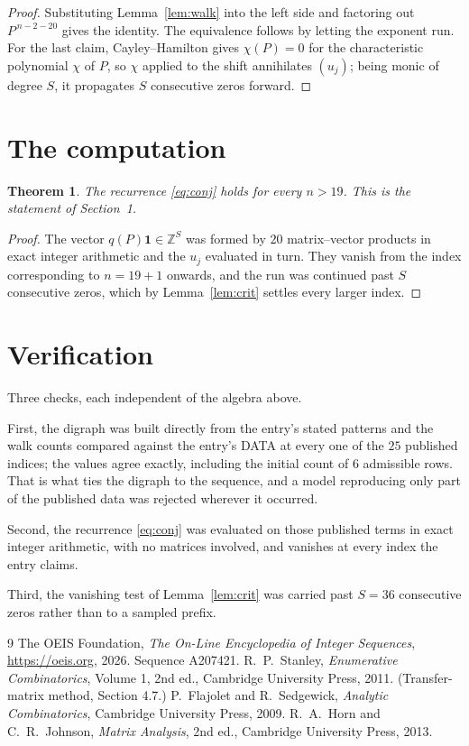 \documentclass[11pt,a4paper]{article}
\theoremstyle{plain}
\newtheorem{theorem}{Theorem}
\theoremstyle{definition}
\begin{document}
\begin{proof}
Substituting Lemma~\ref{lem:walk} into the left side and factoring out
$P^{\,n-2-20}$ gives the identity. The equivalence follows by letting the exponent
run. For the last claim, Cayley--Hamilton gives $\chi(P)=0$ for the characteristic
polynomial $\chi$ of $P$, so $\chi$ applied to the shift annihilates $(u_j)$; being monic of
degree $S$, it propagates $S$ consecutive zeros forward.
\end{proof}

\section{The computation}

\begin{theorem}
The recurrence \eqref{eq:conj} holds for every $n>19$. This is the statement of
Section~1.
\end{theorem}

\begin{proof}
The vector $q(P)\mathbf{1}\in\mathbb{Z}^{S}$ was formed by $20$ matrix--vector
products in exact integer arithmetic and the $u_j$ evaluated in turn. They vanish from the
index corresponding to $n=19+1$ onwards, and the run was continued past $S$ consecutive
zeros, which by Lemma~\ref{lem:crit} settles every larger index.
\end{proof}

\section{Verification}

Three checks, each independent of the algebra above.

First, the digraph was built directly from the entry's stated patterns and the walk counts
compared against the entry's DATA at every one of the $25$ published indices; the
values agree exactly, including the initial count of $6$ admissible rows. That is
what ties the digraph to the sequence, and a model reproducing only part of the published
data was rejected wherever it occurred.

Second, the recurrence \eqref{eq:conj} was evaluated on those published terms in exact
integer arithmetic, with no matrices involved, and vanishes at every index the entry claims.

Third, the vanishing test of Lemma~\ref{lem:crit} was carried past $S=36$ consecutive
zeros rather than to a sampled prefix.

\begin{thebibliography}{9}
 The OEIS Foundation, \emph{The On-Line Encyclopedia of Integer
Sequences}, \url{https://oeis.org}, 2026. Sequence A207421.
 R.~P.~Stanley, \emph{Enumerative Combinatorics}, Volume 1, 2nd ed.,
Cambridge University Press, 2011. (Transfer-matrix method, Section 4.7.)
 P.~Flajolet and R.~Sedgewick, \emph{Analytic Combinatorics}, Cambridge
University Press, 2009.
 R.~A.~Horn and C.~R.~Johnson, \emph{Matrix Analysis}, 2nd ed., Cambridge
University Press, 2013.
\end{thebibliography}
\end{document}
